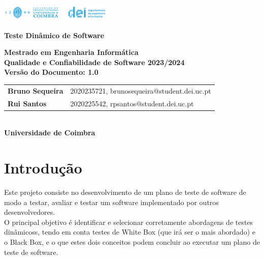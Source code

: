 \documentclass{article}
\begin{document}
\begin{titlepage}
    \centering
    \vspace*{1cm}

    \includegraphics[width=0.4\textwidth]{Images/dei_thumb.png} %

    \vspace{1.5cm}
    {\LARGE \textbf{Teste Dinâmico de Software} \par}
   
    

    \vspace{2.5cm}
    \textbf{Mestrado em Engenharia Informática} \\
    \textbf{Qualidade e Confiabilidade de Software 2023/2024} \\
    \vspace{0.5cm} 
    \textbf{Versão do Documento: 1.0} \\
    \vspace{3cm}
    \begin{tabular}{ll}
        \textbf{Bruno Sequeira} & 2020235721, brunosequeira@student.dei.uc.pt \\
        \textbf{Rui Santos} & 2020225542, rpsantos@student.dei.uc.pt
        
      

    \end{tabular}\\
    \vspace{1.5cm} 
    \textbf{Universidade de Coimbra}

    \date{}

    \vfill

\end{titlepage}
   

\clearpage


\section{Introdução}
\quad Este projeto consiste no desenvolvimento de um plano de teste de software de modo a testar, avaliar e testar um software implementado por outros desenvolvedores.\\ 

\quad O principal objetivo é identificar e selecionar corretamente abordagens de testes dinâmicoss, tendo em conta testes de White Box (que irá ser o mais abordado) e o Black Box, e o que estes dois conceitos podem concluir ao executar um plano de teste de software.
\end{document}
